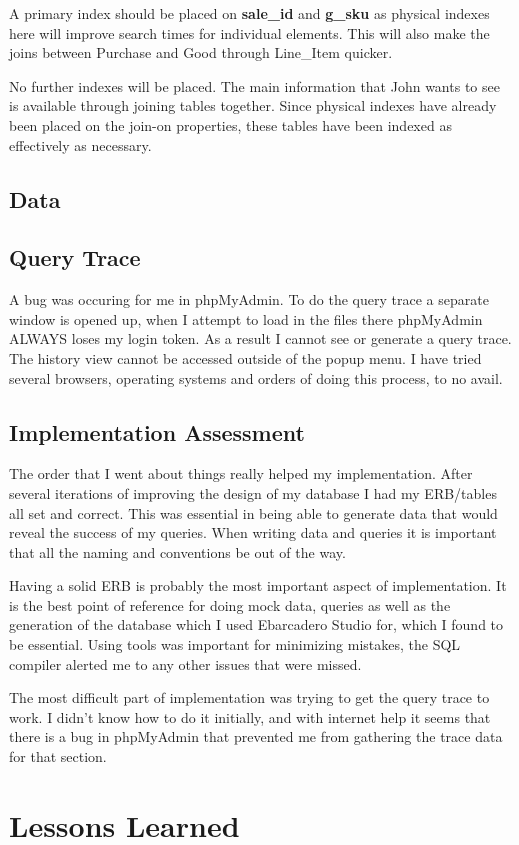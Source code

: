 \documentclass[11pt, a4paper]{report}
\begin{document}
A primary index should be placed on \textbf{sale\_id} and \textbf{g\_sku} as physical indexes here will improve search times for individual elements. This will also make the joins between Purchase and Good through Line\_Item quicker.

No further indexes will be placed. The main information that John wants to see is available through joining tables together. Since physical indexes have already been placed on the join-on properties, these tables have been indexed as effectively as necessary.

\clearpage
\section{Data}
    

\clearpage
\section{Query Trace}
A bug was occuring for me in phpMyAdmin. To do the query trace a separate window is opened up, when I attempt to load in the files there phpMyAdmin ALWAYS loses my login token. As a result I cannot see or generate a query trace. The history view cannot be accessed outside of the popup menu. I have tried several browsers, operating systems and orders of doing this process, to no avail.

\clearpage
\section{Implementation Assessment}
The order that I went about things really helped my implementation. After several iterations of improving the design of my database I had my ERB/tables all set and correct. This was essential in being able to generate data that would reveal the success of my queries. When writing data and queries it is important that all the naming and conventions be out of the way.

Having a solid ERB is probably the most important aspect of implementation. It is the best point of reference for doing mock data, queries as well as the generation of the database which I used Ebarcadero Studio for, which I found to be essential. Using tools was important for minimizing mistakes, the SQL compiler alerted me to any other issues that were missed.

The most difficult part of implementation was trying to get the query trace to work. I didn't know how to do it initially, and with internet help it seems that there is a bug in phpMyAdmin that prevented me from gathering the trace data for that section.

\chapter{Lessons Learned}
\end{document}
